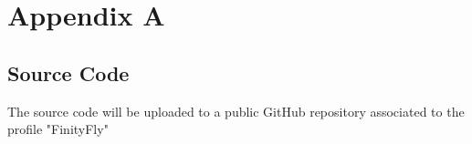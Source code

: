 
\chapter{Appendix A} %

\label{AppendixA} %

\section{Source Code}

The source code will be uploaded to a public GitHub repository associated to the profile "FinityFly"